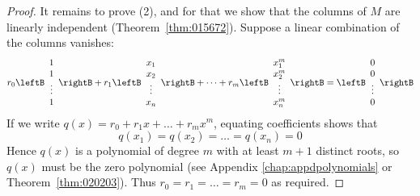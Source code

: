 \begin{proof}
It remains to prove (2), and for that we show that the columns of $M$ are linearly independent (Theorem~\ref{thm:015672}). Suppose a linear combination of the columns vanishes:
\begin{equation*}
r_0 \leftB \begin{array}{c}
	1 \\
	1 \\
	\vdots \\
	1
\end{array} \rightB
+ r_1 \leftB \begin{array}{c}
	x_1 \\
	x_2 \\
	\vdots \\
	x_n
\end{array} \rightB
+ \dots + r_m \leftB \begin{array}{c}
	x_1^m \\
	x_2^m \\
	\vdots \\
	x_n^m
\end{array} \rightB
= \leftB \begin{array}{c}
	0 \\
	0 \\
	\vdots \\
	0 \\
\end{array} \rightB
\end{equation*}
If we write $q(x) = r_{0} + r_{1}x + \dots + r_{m}x^{m}$, equating coefficients shows that 
\begin{equation*}
q(x_{1}) = q(x_{2}) = \dots = q(x_{n}) = 0
\end{equation*}
Hence $q(x)$ is a polynomial of degree $m$ with at least $m + 1$ distinct roots, so $q(x)$ must be the zero polynomial (see Appendix \ref{chap:appdpolynomials} or Theorem~\ref{thm:020203}). Thus $r_{0} = r_{1} = \dots = r_{m} = 0$ as required.
\end{proof}

